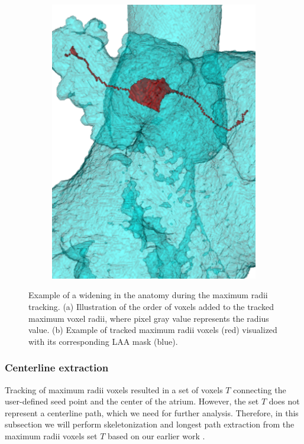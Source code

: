 \documentclass[review]{elsarticle}
\begin{document}
\begin{figure}[t]
\begin{subfigure}[b]{.35\linewidth}
    \includegraphics[width=\textwidth]{fig3b.png}
    \caption{}
    \label{fig:centerline_path}  
  \end{subfigure}
  \caption{Example of a widening in the anatomy during the maximum radii
  tracking. (a) Illustration of the order of voxels added to the tracked
  maximum voxel radii, where pixel gray value represents the radius value. (b)
  Example of tracked maximum radii voxels (red) visualized with its corresponding
  LAA mask (blue).}
  \label{fig:widening}
\end{figure}




\subsubsection{Centerline extraction}
\label{sec:centerline_interpolation}

Tracking of maximum radii voxels resulted in a set of voxels $T$ connecting the
user-defined seed point and the center of the atrium. However, the set $T$ does
not represent a centerline path, which we need for further analysis. Therefore,
in this subsection we will perform skeletonization and longest path extraction
from the maximum radii voxels set $T$ based on our earlier work
\cite{babin2018_Skeletonizationmethodvessel}.
\end{document}
